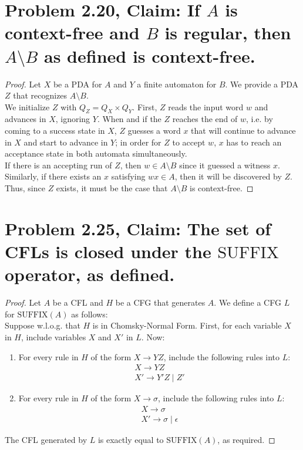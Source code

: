 \documentclass[12pt]{article}
\begin{document}
\section*{Problem 2.20, Claim: If $A$ is context-free and $B$ is regular, then $A \setminus B$ as defined is context-free.}
\begin{proof}
  Let $X$ be a PDA for $A$ and $Y$ a finite automaton for $B$. We provide a PDA $Z$ that recognizes $A \setminus B$. \\
  \newline
  We initialize $Z$ with $Q_{Z} = Q_{X} \times Q_{Y}$. First, $Z$ reads the input word $w$ and advances in $X$, ignoring $Y$. When and if the $Z$ reaches the end of $w$, i.e. by coming to a success state in $X$, $Z$ guesses a word $x$ that will continue to advance in $X$ and start to advance in $Y$; in order for $Z$ to accept $w$, $x$ has to reach an acceptance state in both automata simultaneously. \\
  \newline
  If there is an accepting run of $Z$, then $w \in A \setminus B$ since it guessed a witness $x$. Similarly, if there exists an $x$ satisfying $wx \in A$, then it will be discovered by $Z$. Thus, since $Z$ exists, it must be the case that $A \setminus B$ is context-free.
\end{proof}

\section*{Problem 2.25, Claim: The set of CFLs is closed under the $\text{SUFFIX}$ operator, as defined.}
\begin{proof}
  Let $A$ be a CFL and $H$ be a CFG that generates $A$. We define a CFG $L$ for $\text{SUFFIX}(A)$ as follows: \\
  \newline
  Suppose w.l.o.g. that $H$ is in Chomsky-Normal Form. First, for each variable $X$ in $H$, include variables $X$ and $X'$ in $L$. Now:
  \begin{enumerate}
  \item For every rule in $H$ of the form $X \rightarrow YZ$, include the following rules into $L$:
    \begin{align*}
      X \rightarrow YZ \nonumber \\
      X' \rightarrow Y'Z \mid Z'
    \end{align*}
  \item For every rule in $H$ of the form $X \rightarrow \sigma$, include the following rules into $L$:
    \begin{align*}
      X \rightarrow \sigma \nonumber \\
      X' \rightarrow \sigma \mid \epsilon \nonumber
    \end{align*}
  \end{enumerate}
  The CFL generated by $L$ is exactly equal to $\text{SUFFIX}(A)$, as required.
\end{proof}
\end{document}
